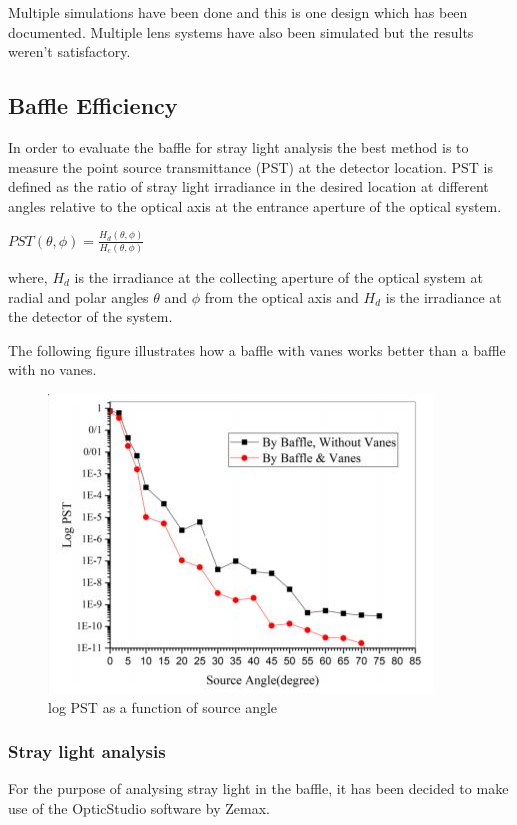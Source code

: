\documentclass[../../main.tex]{subfiles}
\begin{document}
Multiple simulations have been done and this is one design which has been documented. Multiple lens systems have also been simulated but the results weren't satisfactory.
\subsection{Baffle Efficiency}
In order to evaluate the baffle for stray light analysis the best method is to measure the point source transmittance (PST) at the detector location. PST is defined as the ratio of stray light irradiance in the desired location at different angles relative to the optical axis at the entrance aperture of the optical system.
\vspace{1em}
\begin{center}
    $PST(\theta,\phi) =\frac{H_{d}(\theta,\phi)}{H_{c}(\theta,\phi)} $
\end{center}
\par
where, $H_d$ is the irradiance at the collecting aperture of the optical system at radial and polar angles $\theta$ and $\phi$ from the optical axis  and $H_d$ is the irradiance at the detector of the system.
\par
The following figure illustrates how a baffle with vanes works better than  a baffle with no vanes.

\par
\begin{figure}[h]
    \centering
    \includegraphics{Figures/Instrumentation/point_source_transmittance.JPG}
    \caption{log PST as a function of source angle}
    \label{fig:12.1}
\end{figure}

\subsubsection{Stray light analysis}
For the purpose of analysing stray light in the baffle, it has been decided to make use of the OpticStudio software by Zemax.
\end{document}
